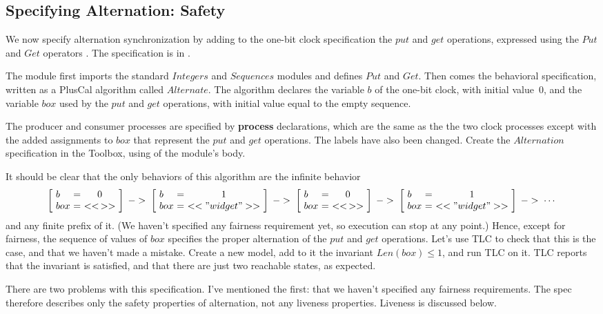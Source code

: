 \documentclass[fleqn,leqno]{article}
\makeatletter
\newcommand{\altstate}[2]{\left[\!\begin{array}{l@{\,\,}c@{\,\,}c}
                        b & = & #1 \\ box & = & #2
                        \end{array}\!\right]}
\makeatother
\begin{document}
\subsection{Specifying Alternation: Safety} 

We now specify alternation synchronization by adding to the one-bit
clock specification the $put$ and $get$ operations, expressed using
the $Put$ and $Get$ operators .  The
specification is in .

The module first imports the standard $Integers$ and $Sequences$
modules and defines $Put$ and $Get$.  Then comes the behavioral
specification, written as a PlusCal algorithm called $Alternate$.  The
algorithm declares the variable $b$ of the one-bit clock, with
initial value~0, and the variable $box$ used by the $put$ and $get$
operations, with initial value equal to the empty sequence.

The producer and consumer processes are specified by 
\textbf{process}
declarations, which are the same as the the two clock processes except
with the added assignments to $box$ that represent the $put$ and $get$
operations.  The labels have also been changed.  Create the
$Alternation$ specification in the Toolbox, using
 of the
module's body.

It should be clear that the only behaviors of this algorithm are
the infinite behavior%
 \[
  \altstate{0}{<<\,>>} \;->\; \altstate{1}{<<"widget">>} \;->\; 
  \altstate{0}{<<\,>>} \;->\; \altstate{1}{<<"widget">>} \;->\; \cdots
 \] 
and any finite prefix of it.  (We haven't specified any fairness
requirement yet, so execution can stop at any point.)  Hence, except for
fairness, the sequence of values of $box$ specifies the proper
alternation of the $put$ and $get$ operations.  Let's use TLC to check
that this is the case, and that we haven't made a mistake.  Create a
new model, add to it the invariant $Len(box) \leq 1$, and run TLC on
it.  TLC reports that the invariant is satisfied, and that there are
just two reachable states, as expected.

There are two problems with this specification.  I've mentioned the
first: that we haven't specified any fairness requirements.  The spec
therefore describes only the safety properties of alternation, not any
liveness properties.  Liveness is discussed below.  
\end{document}
